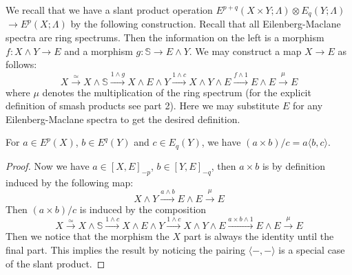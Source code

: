 	\begin{defn}
		We recall that we have a slant product operation $E^{p+q}(X\times Y;\Lambda)\otimes E_q(Y;\Lambda)$ \\
		$\to E^p(X;\Lambda)$ by the following construction. Recall that all Eilenberg-Maclane spectra are ring spectrums. Then the information on the left is a morphism $f:X\wedge Y\to E$ and a morphism $g:\mathbb{S}\to E\wedge Y$. We may construct a map $X\to E$ as follows: 
		\[ X\xrightarrow{\simeq}X\wedge\mathbb{S}\xrightarrow{1\wedge g}X\wedge E\wedge Y\xrightarrow{1\wedge c}X\wedge Y\wedge E\xrightarrow{f\wedge 1}E\wedge E\xrightarrow{\mu}E \]
		where $\mu$ denotes the multiplication of the ring spectrum (for the explicit definition of smash products see part 2). Here we may substitute $E$ for any Eilenberg-Maclane spectra to get the desired definition. 
	\end{defn}
	\begin{lemma}
		For $a\in E^p(X)$, $b\in E^q(Y)$ and $c\in E_q(Y)$, we have $(a\times b)/c=a\langle b,c\rangle$. 
	\end{lemma}
	\begin{proof}
		Now we have $a\in[X,E]_{-p}$, $b\in[Y,E]_{-q}$, then $a\times b$ is by definition induced by the following map: 
		\[ X\wedge Y\xrightarrow{a\wedge b}E\wedge E\xrightarrow{\mu}E \]
		Then $(a\times b)/c$ is induced by the composition 
		\[ X\xrightarrow{\simeq}X\wedge\mathbb{S}\xrightarrow{1\wedge c}X\wedge E\wedge Y\xrightarrow{1\wedge c}X\wedge Y\wedge E\xrightarrow{a\times b\wedge 1}E\wedge E\xrightarrow{\mu}E \]
		Then we notice that the morphism the $X$ part is always the identity until the final part. This implies the result by noticing the pairing $\langle-,-\rangle$ is a special case of the slant product. 
	\end{proof}

